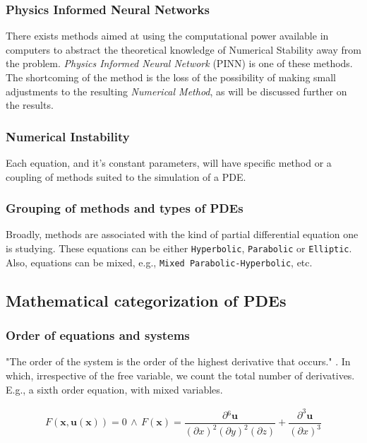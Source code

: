 \documentclass[11pt]{article}
\begin{document}
\subsubsection{Physics Informed Neural Networks}
\label{sec:orga72aac0}
There exists methods aimed at using the computational power available in computers
to abstract the theoretical knowledge of Numerical Stability away from
the problem. \emph{Physics Informed Neural Network}
(PINN) is one of these methods. The shortcoming of the method is the loss of the
possibility of making small adjustments to the resulting \emph{Numerical
Method}, as will be discussed further on the results.

\subsubsection{Numerical Instability}
\label{sec:org44ca627}
Each equation, and it's constant parameters, will have specific method
or a coupling of methods suited to the simulation of a PDE.

\subsubsection{Grouping of methods and types of PDEs}
\label{sec:orgc87c1e4}
Broadly, methods are associated with the kind of partial differential
equation one is studying. These equations can be either \texttt{Hyperbolic},
\texttt{Parabolic} or \texttt{Elliptic}. Also, equations can be mixed, e.g., \texttt{Mixed
Parabolic-Hyperbolic}, etc.

\subsection{Mathematical categorization of PDEs}
\label{sec:org156a1ef}
\subsubsection{Order of equations and systems}
\label{sec:org3ba969a}
"The order of the system is the order of the highest derivative that occurs."
\cite{john1978partial}. In which, irrespective of the free variable, we count the
total number of derivatives. E.g., a sixth order equation, with mixed variables.

\begin{equation}
\label{eq:sixth-order}
\begin{aligned}
F(\mathbf{x},\mathbf{u(x)}) = 0 \, \land \,
F(\mathbf{x}) = \dfrac{\partial{}^6 \mathbf{u}}{(\partial{x})^2(\partial{y})^2(\partial{z})} + \dfrac{\partial^3{} \mathbf{u}}{(\partial{x})^3}
\end{aligned}
\end{equation}
\end{document}

